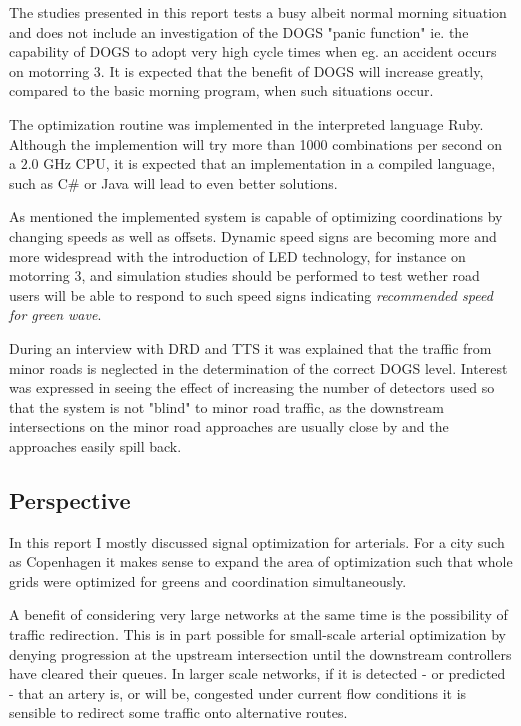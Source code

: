 The studies presented in this report tests a busy albeit normal morning situation and does not include an investigation of the DOGS "panic function" ie. the capability of DOGS to adopt very high cycle times when eg. an accident occurs on motorring 3. It is expected that the benefit of DOGS will increase greatly, compared to the basic morning program, when such situations occur.

The optimization routine was implemented in the interpreted language Ruby. Although the implemention will try more than 1000 combinations per second on a $2.0$ GHz CPU, it is expected that an implementation in a compiled language, such as C\# or Java will lead to even better solutions.

As mentioned the implemented system is capable of optimizing coordinations by changing speeds as well as offsets. Dynamic speed signs are becoming more and more widespread with the introduction of LED technology, for instance on motorring 3, and simulation studies should be performed to test wether road users will be able to respond to such speed signs indicating \textit{recommended speed for green wave}.

During an interview with DRD and TTS it was explained that the traffic from minor roads is neglected in the determination of the correct DOGS level. Interest was expressed in seeing the effect of increasing the number of detectors used so that the system is not "blind" to minor road traffic, as the downstream intersections on the minor road approaches are usually close by and the approaches easily spill back.

\subsection{Perspective}
In this report I mostly discussed signal optimization for arterials. For a city such as Copenhagen it makes sense to expand the area of optimization such that whole grids were optimized for greens and coordination simultaneously.

A benefit of considering very large networks at the same time is the possibility of traffic redirection. This is in part possible for small-scale arterial optimization by denying progression at the upstream intersection until the downstream controllers have cleared their queues. In larger scale networks, if it is detected - or predicted - that an artery is, or will be, congested under current flow conditions it is sensible to redirect some traffic onto alternative routes. 

